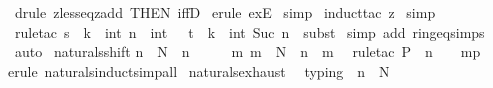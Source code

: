 \begin{isabellebody}
\isamarkupfalse%
\ {\isacharparenleft}drule\ zless{\isacharunderscore}eq{\isacharunderscore}zadd\ {\isacharbrackleft}THEN\ iffD{}{\isacharbrackright}{\isacharparenright}\isanewline
{}\isamarkupfalse%
\ {\isacharparenleft}erule\ exE{\isacharparenright}\isanewline
{}\isamarkupfalse%
\ {\isacharparenleft}simp{\isacharparenright}\isanewline
{}\isamarkupfalse%
\ {\isacharparenleft}induct{\isacharunderscore}tac\ {\isachardoublequoteopen}z{\isachardoublequoteclose}{\isacharparenright}\isanewline
{}\isamarkupfalse%
\ simp\isanewline
{}\isamarkupfalse%
\ {\isacharparenleft}rule{\isacharunderscore}tac\ s\ {\isacharequal}\ {\isachardoublequoteopen}{\isacharparenleft}k\ {\isacharplus}\ int\ n{\isacharparenright}\ {\isacharplus}\ int\ {}{\isachardoublequoteclose}\ \ t\ {\isacharequal}\ {\isachardoublequoteopen}k\ {\isacharplus}\ int\ {\isacharparenleft}Suc\ n{\isacharparenright}{\isachardoublequoteclose}\ \ subst{\isacharparenright}\isanewline
{}\isamarkupfalse%
\ {\isacharparenleft}simp\ add{\isacharcolon}\ ring{\isacharunderscore}eq{\isacharunderscore}simps{\isacharparenright}\isanewline
{}\isamarkupfalse%
\ auto\isanewline
{}\isamarkupfalse%
%
\endisatagproof
{\isafoldproof}%
%
\isadelimproof
\isanewline
%
\endisadelimproof
\isanewline
{}\isamarkupfalse%
\ naturals{\isacharunderscore}shift{\isacharcolon}\isanewline
{\isachardoublequoteopen}{\isasymlbrakk}n\ {\isasymin}\ {\isacharpercent}N\ {\isacharsemicolon}\ n\ {\isasymnoteq}\ {}\ {\isasymrbrakk}\ {\isasymLongrightarrow}\ {\isasymexists}\ m{\isachardot}\ {\isacharparenleft}m\ {\isasymin}\ {\isacharpercent}N\ {\isasymand}\ n\ {\isacharequal}\ m\ {\isacharplus}\ {}{\isacharparenright}{\isachardoublequoteclose}\isanewline
%
\isadelimproof
%
\endisadelimproof
%
\isatagproof
{}\isamarkupfalse%
{\isacharparenleft}rule{\isacharunderscore}tac\ P\ {\isacharequal}\ {\isachardoublequoteopen}n\ {\isasymnoteq}\ {}{\isachardoublequoteclose}\ \ mp{\isacharparenright}\isanewline
{}\isamarkupfalse%
{\isacharparenleft}erule\ naturals{\isacharunderscore}induct{\isacharcomma}simp{\isacharunderscore}all{\isacharparenright}%
\endisatagproof
{\isafoldproof}%
%
\isadelimproof
\isanewline
%
\endisadelimproof
\isanewline
{}\isamarkupfalse%
\ naturals{\isacharunderscore}exhaust\ {\isacharcolon}\isanewline
{}\ typing\ {\isacharcolon}\ {\isachardoublequoteopen}n\ {\isasymin}\ {\isacharpercent}N{\isachardoublequoteclose}\isanewline

\end{isabellebody}

